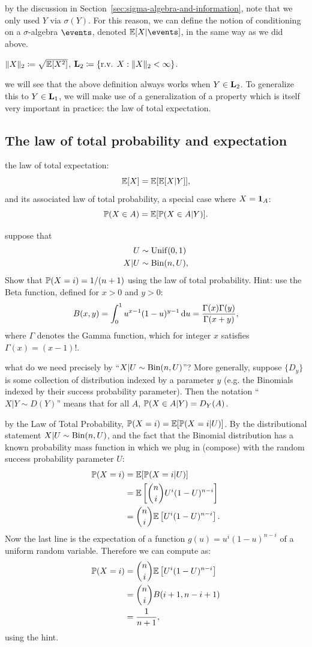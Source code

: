 \documentclass{article}
\begin{document}
 by the discussion in Section~\ref{sec:sigma-algebra-and-information}, note that we only used $Y$ via $\sigma(Y)$. For this reason, we can define the notion of conditioning on a $\sigma$-algebra $\events$, denoted $\E[X|\events]$, in the same way as we did above.

 $\|X\|_2 \defeq \sqrt{\E[X^2]}$, $\L_2 \defeq \{\text{r.v. } X : \|X\|_2 < \infty\}$.

 we will see that the above definition always works when $Y \in \L_2$. To generalize this to $Y \in \L_1$, we will make use of a generalization of a property which is itself very important in practice: the law of total expectation.


\subsection{The law of total probability and expectation}

 the law of total expectation:
\[ \E[X] = \E[\E[X|Y]], \]
and its associated law of total probability, a special case where $X = \1_A$:
\[ \P(X \in A) = \E[ \P(X \in A|Y) ]. \]

 suppose that
\begin{eqnarray*}
U &\sim \Unif(0,1) \\
X | U &\sim \Bin(n, U),
\end{eqnarray*}
Show that $\P(X = i) = 1/(n+1)$ using the law of total probability. Hint: use the Beta function, defined for $x> 0$ and $y > 0$:
\[ B(x, y) = \int_0^1 u^{x-1} (1-u)^{y-1} \ud u = \frac{\Gamma(x) \Gamma(y)}{\Gamma(x+y)}, \]
where $\Gamma$ denotes the Gamma function, which for integer $x$ satisfies $\Gamma(x) = (x-1)!$.

 what do we need precisely by ``$X | U \sim \Bin(n, U)$''? More generally, suppose $\{D_y\}$ is some collection of distribution indexed by a parameter $y$ (e.g. the Binomials indexed by their success probability parameter). Then the notation ``$X|Y\sim D(Y)$'' means that for all $A$, $\P(X\in A|Y) = D_Y(A)$.

 by the Law of Total Probability, $\P(X=i) = \E[ \P(X=i | U) ]$. By the distributional statement $X|U \sim \Bin(n, U)$, and the fact that the Binomial distribution has a known probability mass function in which we plug in (compose) with the random success probability parameter $U$:
\begin{align*}
	\P(X = i) &= \E[ \P(X=i | U)] \\
	&= \E\left[ \binom{n}{i} U^i (1 - U)^{n-i} \right] \\
	&= \binom{n}{i} \E\left[ U^i (1-U)^{n-i} \right].
\end{align*}
Now the last line is the expectation of a function $g(u) = u^i (1-u)^{n-i}$ of a uniform random variable. Therefore we can compute as:
\begin{align*}
	\P(X = i) &= \binom{n}{i} \E\left[ U^i (1-U)^{n-i} \right] \\
	&= \binom{n}{i} B(i+1, n - i + 1) \\
	&= \frac{1}{n+1},
\end{align*}
using the hint.
\end{document}
